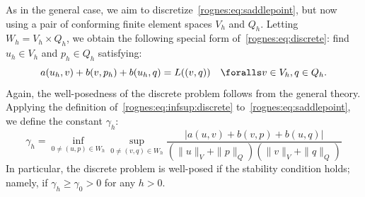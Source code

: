 As in the general case, we aim to
discretize~\eqref{rognes:eq:saddlepoint}, but now using a pair of
conforming finite element spaces $V_h$ and $Q_h$. Letting $W_h = V_h
\times Q_h$, we obtain the following special form
of~\eqref{rognes:eq:discrete}: find $u_h \in V_h$ and $p_h \in Q_h$
satisfying:
\begin{equation}
    \label{rognes:eq:saddlepoint:discrete}
    a(u_h, v) + b(v, p_h) + b(u_h, q) = L((v, q))
    \quad \foralls v \in V_h, q \in Q_h.
\end{equation}
Again, the well-posedness of the discrete problem follows from the
general theory. Applying the definition
of~\eqref{rognes:eq:infsup:discrete} to~\eqref{rognes:eq:saddlepoint},
we define the \babuska{} constant $\gamma_h$:
\begin{equation}
  \label{rognes:eq:Babuska}
  \gamma_h = \inf_{0 \not = (u, p) \in W_h} \sup_{0 \not = (v, q) \in W_h}
  \frac{|a(u, v) + b(v, p) + b(u, q)|} {(\|u\|_{V} + \|p\|_{Q})
    (\|v\|_{V} + \|q\|_{Q})}
\end{equation}
In particular, the discrete problem is well-posed if the \babuska{}
stability condition holds; namely, if $\gamma_h \geqslant \gamma_0 > 0$ for
any $h > 0$.


